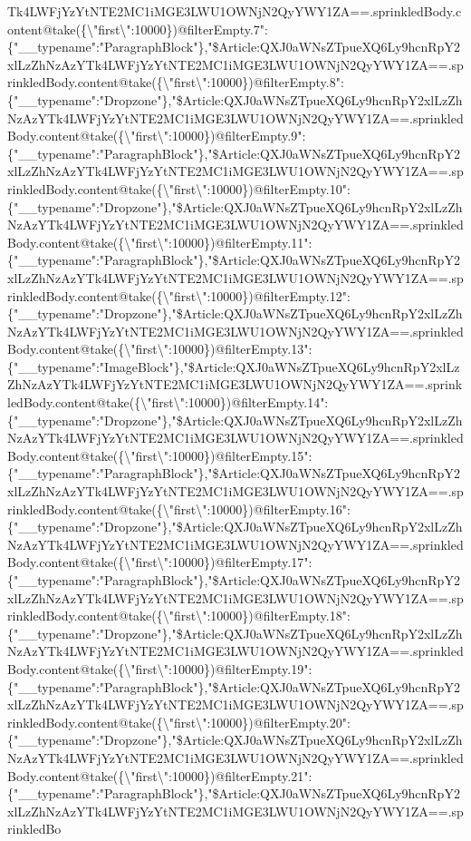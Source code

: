 Tk4LWFjYzYtNTE2MC1iMGE3LWU1OWNjN2QyYWY1ZA==.sprinkledBody.content@take(\{\textbackslash{}"first\textbackslash{}":10000\})@filterEmpty.7":\{"\_\_typename":"ParagraphBlock"\},"\$Article:QXJ0aWNsZTpueXQ6Ly9hcnRpY2xlLzZhNzAzYTk4LWFjYzYtNTE2MC1iMGE3LWU1OWNjN2QyYWY1ZA==.sprinkledBody.content@take(\{\textbackslash{}"first\textbackslash{}":10000\})@filterEmpty.8":\{"\_\_typename":"Dropzone"\},"\$Article:QXJ0aWNsZTpueXQ6Ly9hcnRpY2xlLzZhNzAzYTk4LWFjYzYtNTE2MC1iMGE3LWU1OWNjN2QyYWY1ZA==.sprinkledBody.content@take(\{\textbackslash{}"first\textbackslash{}":10000\})@filterEmpty.9":\{"\_\_typename":"ParagraphBlock"\},"\$Article:QXJ0aWNsZTpueXQ6Ly9hcnRpY2xlLzZhNzAzYTk4LWFjYzYtNTE2MC1iMGE3LWU1OWNjN2QyYWY1ZA==.sprinkledBody.content@take(\{\textbackslash{}"first\textbackslash{}":10000\})@filterEmpty.10":\{"\_\_typename":"Dropzone"\},"\$Article:QXJ0aWNsZTpueXQ6Ly9hcnRpY2xlLzZhNzAzYTk4LWFjYzYtNTE2MC1iMGE3LWU1OWNjN2QyYWY1ZA==.sprinkledBody.content@take(\{\textbackslash{}"first\textbackslash{}":10000\})@filterEmpty.11":\{"\_\_typename":"ParagraphBlock"\},"\$Article:QXJ0aWNsZTpueXQ6Ly9hcnRpY2xlLzZhNzAzYTk4LWFjYzYtNTE2MC1iMGE3LWU1OWNjN2QyYWY1ZA==.sprinkledBody.content@take(\{\textbackslash{}"first\textbackslash{}":10000\})@filterEmpty.12":\{"\_\_typename":"Dropzone"\},"\$Article:QXJ0aWNsZTpueXQ6Ly9hcnRpY2xlLzZhNzAzYTk4LWFjYzYtNTE2MC1iMGE3LWU1OWNjN2QyYWY1ZA==.sprinkledBody.content@take(\{\textbackslash{}"first\textbackslash{}":10000\})@filterEmpty.13":\{"\_\_typename":"ImageBlock"\},"\$Article:QXJ0aWNsZTpueXQ6Ly9hcnRpY2xlLzZhNzAzYTk4LWFjYzYtNTE2MC1iMGE3LWU1OWNjN2QyYWY1ZA==.sprinkledBody.content@take(\{\textbackslash{}"first\textbackslash{}":10000\})@filterEmpty.14":\{"\_\_typename":"Dropzone"\},"\$Article:QXJ0aWNsZTpueXQ6Ly9hcnRpY2xlLzZhNzAzYTk4LWFjYzYtNTE2MC1iMGE3LWU1OWNjN2QyYWY1ZA==.sprinkledBody.content@take(\{\textbackslash{}"first\textbackslash{}":10000\})@filterEmpty.15":\{"\_\_typename":"ParagraphBlock"\},"\$Article:QXJ0aWNsZTpueXQ6Ly9hcnRpY2xlLzZhNzAzYTk4LWFjYzYtNTE2MC1iMGE3LWU1OWNjN2QyYWY1ZA==.sprinkledBody.content@take(\{\textbackslash{}"first\textbackslash{}":10000\})@filterEmpty.16":\{"\_\_typename":"Dropzone"\},"\$Article:QXJ0aWNsZTpueXQ6Ly9hcnRpY2xlLzZhNzAzYTk4LWFjYzYtNTE2MC1iMGE3LWU1OWNjN2QyYWY1ZA==.sprinkledBody.content@take(\{\textbackslash{}"first\textbackslash{}":10000\})@filterEmpty.17":\{"\_\_typename":"ParagraphBlock"\},"\$Article:QXJ0aWNsZTpueXQ6Ly9hcnRpY2xlLzZhNzAzYTk4LWFjYzYtNTE2MC1iMGE3LWU1OWNjN2QyYWY1ZA==.sprinkledBody.content@take(\{\textbackslash{}"first\textbackslash{}":10000\})@filterEmpty.18":\{"\_\_typename":"Dropzone"\},"\$Article:QXJ0aWNsZTpueXQ6Ly9hcnRpY2xlLzZhNzAzYTk4LWFjYzYtNTE2MC1iMGE3LWU1OWNjN2QyYWY1ZA==.sprinkledBody.content@take(\{\textbackslash{}"first\textbackslash{}":10000\})@filterEmpty.19":\{"\_\_typename":"ParagraphBlock"\},"\$Article:QXJ0aWNsZTpueXQ6Ly9hcnRpY2xlLzZhNzAzYTk4LWFjYzYtNTE2MC1iMGE3LWU1OWNjN2QyYWY1ZA==.sprinkledBody.content@take(\{\textbackslash{}"first\textbackslash{}":10000\})@filterEmpty.20":\{"\_\_typename":"Dropzone"\},"\$Article:QXJ0aWNsZTpueXQ6Ly9hcnRpY2xlLzZhNzAzYTk4LWFjYzYtNTE2MC1iMGE3LWU1OWNjN2QyYWY1ZA==.sprinkledBody.content@take(\{\textbackslash{}"first\textbackslash{}":10000\})@filterEmpty.21":\{"\_\_typename":"ParagraphBlock"\},"\$Article:QXJ0aWNsZTpueXQ6Ly9hcnRpY2xlLzZhNzAzYTk4LWFjYzYtNTE2MC1iMGE3LWU1OWNjN2QyYWY1ZA==.sprinkledBo